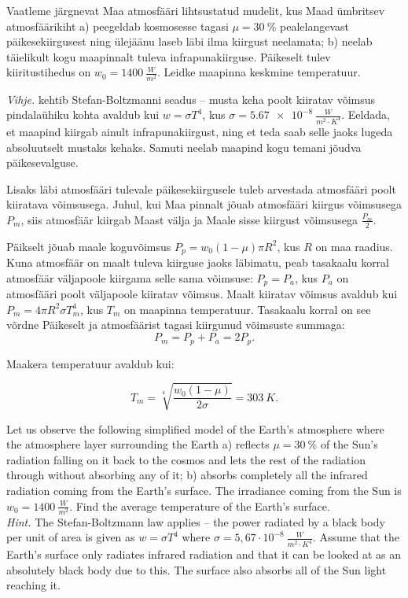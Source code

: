 
Vaatleme järgnevat Maa atmosfääri lihtsustatud mudelit, kus Maad ümbritsev atmosfäärikiht a) peegeldab kosmosesse tagasi $\mu=\SI{30}{\%}$ pealelangevast päikesekiirgusest ning ülejäänu laseb läbi ilma kiirgust neelamata; b) neelab täielikult kogu maapinnalt tuleva infrapunakiirguse. Päikeselt tulev kiiritustihedus on $w_0=\SI{1400}{\frac{W}{m^2}}$. Leidke maapinna keskmine temperatuur.

\textit{Vihje.} kehtib Stefan-Boltzmanni seadus -- musta keha poolt kiiratav võimsus pindalaühiku kohta avaldub kui $w=\sigma T^4$, kus $\sigma=\SI{5.67e-8}{\frac{W}{m^2 \cdot K^4}}$. Eeldada, et maapind kiirgab ainult infrapunakiirgust, ning et teda saab selle jaoks lugeda absoluutselt mustaks kehaks. Samuti neelab maapind kogu temani jõudva päikesevalguse.

\hint
Lisaks läbi atmosfääri tulevale päikesekiirgusele tuleb arvestada atmosfääri poolt kiiratava võimsusega. Juhul, kui Maa pinnalt jõuab atmosfääri kiirgus võimsusega $P_m$, siis atmosfäär kiirgab Maast välja ja Maale sisse kiirgust võimsusega $\frac{P_m}{2}$.

\solu
Päikselt jõuab maale koguvõimsus $P_p=w_0 \left(1-\mu\right)\pi R^2$, kus $R$ on maa raadius. Kuna atmosfäär on maalt tuleva kiirguse jaoks läbimatu, peab tasakaalu korral atmosfäär väljapoole kiirgama selle sama võimsuse: $P_p=P_a$, kus $P_a$ on atmosfääri poolt väljapoole kiiratav võimsus. Maalt kiiratav võimsus avaldub kui $P_m=4 \pi R^2 \sigma T_m^4$, kus $T_m$ on maapinna temperatuur. Tasakaalu korral on see võrdne Päikeselt ja atmosfäärist tagasi kiirgunud võimsuste summaga:
\[P_m=P_p+P_a=2P_p.\]

Maakera temperatuur avaldub kui:

\[T_m=\sqrt[4]{\frac{w_0\left(1-\mu\right)}{2\sigma}}=\SI{303}{K}.\]

Let us observe the following simplified model of the Earth’s atmosphere where the atmosphere layer surrounding the Earth a) reflects $\mu=\SI{30}{\%}$ of the Sun’s radiation falling on it back to the cosmos and lets the rest of the radiation through without absorbing any of it; b) absorbs completely all the infrared radiation coming from the Earth’s surface. The irradiance coming from the Sun is $w_0=\SI{1400}{\frac{W}{m^2}}$. Find the average temperature of the Earth’s surface.\\
\emph{Hint.} The Stefan-Boltzmann law applies – the power radiated by a black body per unit of area is given as $w=\sigma T^4$ where $\sigma =5,67 \cdot 10^{-8} \SI{}{\frac{W}{m^2 \cdot K^4}}$. Assume that the Earth’s surface only radiates infrared radiation and that it can be looked at as an absolutely black body due to this. The surface also absorbs all of the Sun light reaching it.

